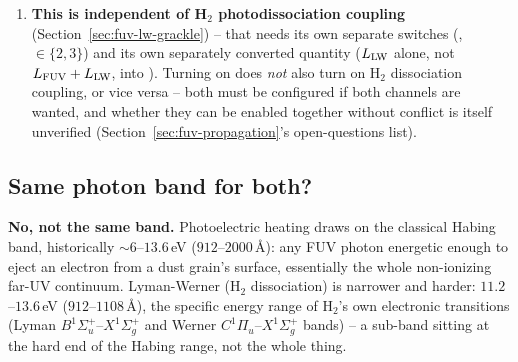 \begin{enumerate}
    needs the local density (to recover the volumetric energy density
    $\rho_i u_i$) and a factor of $c$ (the standard
    flux~$\sim c\times$energy-density relation for a
    quasi-isotropic radiation field, matching the moment definitions
    $E_\nu=\int(I_\nu/c)\,{\rm d}\Omega$, $F_\nu=\int I_\nu\,\mathbf
    n\,{\rm d}\Omega$ already used in Section~\ref{sec:fuv-b-p1}):
    \begin{equation}
      G_{0,i} = \frac{c\,\rho_i\,u_i}{1.6\times10^{-3}\,
        {\rm erg\,s^{-1}\,cm^{-2}}} ,
      \label{eq:fuv-g0-conversion}
    \end{equation}
    with $u_i$ the sum of both bands' specific energy
    ($L_{\rm FUV}+L_{\rm LW}$ injected per Eq.~\ref{eq:fuv-inject}, per
    Section~\ref{sec:fuv-two-bands}). This is the one number this
    codebase is actually responsible for producing; everything else in
    this list is Grackle configuration, not new code.
  \item \textbf{This is independent of H$_2$ photodissociation
    coupling} (Section~\ref{sec:fuv-lw-grackle}) -- that needs its own
    separate switches (,
    $\in\{2,3\}$) and its own separately
    converted quantity ($L_{\rm LW}$ alone, not $L_{\rm FUV}+L_{\rm
    LW}$, into ). Turning on
     does \emph{not} also turn on H$_2$
    dissociation coupling, or vice versa -- both must be configured
    if both channels are wanted, and whether they can be enabled
    together without conflict is itself unverified
    (Section~\ref{sec:fuv-propagation}'s open-questions list).
\end{enumerate}

\subsection{Same photon band for both?}
\label{sec:fuv-band-question}

\textbf{No, not the same band.} Photoelectric heating draws on the
classical Habing band, historically $\sim6$--$13.6\,$eV
($912$--$2000$\,\AA): any FUV photon energetic enough to eject an
electron from a dust grain's surface, essentially the whole
non-ionizing far-UV continuum. Lyman-Werner (H$_2$ dissociation) is
narrower and harder: $11.2$--$13.6\,$eV ($912$--$1108$\,\AA), the
specific energy range of H$_2$'s own electronic transitions (Lyman
$B^1\Sigma_u^+$--$X^1\Sigma_g^+$ and Werner
$C^1\Pi_u$--$X^1\Sigma_g^+$ bands) -- a sub-band sitting at the hard
end of the Habing range, not the whole thing.

